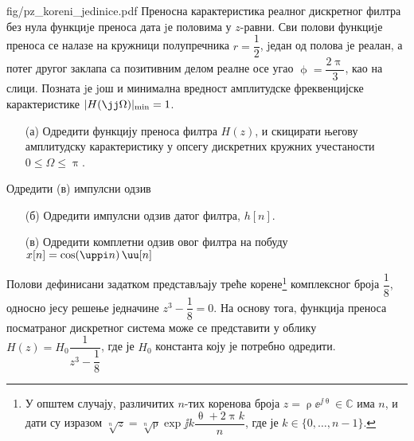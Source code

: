 \begin{slikaDesno}{fig/pz_koreni_jedinice.pdf}
    \PID 
    Преносна карактеристика реалног дискретног филтра без нула функциjе преноса
    дата jе половима у $z$-равни. Сви полови функциjе преноса се налазе на кружници
    полупречника $r = \dfrac12$, jедан од полова jе реалан, а потег другог заклапа са позитивним
    делом реалне осе угао $\upphi = \dfrac{2\uppi}{3}$, као на слици. Позната jе jош и минимална вредност
    амплитудске фреквенцијске карактеристике $|H(\jj\Omega)|_{\rm min} = 1$. 
    \begin{enumerate}
        \item[(а)]  Одредити функцију
                    преноса филтра $H(z)$, и скицирати његову амплитудску карактеристику у 
                    опсегу дискретних кружних учестаности $0 \leq \Omega \leq \uppi$.
    \end{enumerate}
    Одредити (в) импулсни одзив
\end{slikaDesno}
\begin{enumerate}
    \item[(б)] Одредити импулсни одзив датог филтра, $h[n]$. 
    \item[(в)] Одредити комплетни одзив овог филтра на побуду $x[n] = \cos(\uppi n)\, \uu[n]$
\end{enumerate}

\RESENJE
Полови дефинисани задатком представљају треће корене\footnote{У општем случају, различитих $n$-тих коренова  
броја $z = \uprho \ee^{\jj\uptheta} \in \mathbb C$ има $n$, и дати су изразом 
$\sqrt[n]{z} = \sqrt[n]{\uprho} \exp{\jj k \dfrac{\uptheta + 2\uppi k}{n}}$, где је $k \in \{0,\ldots,n-1\}$.} 
комплексног броја $\dfrac{1}{8}$, односно јесу решење једначине 
$z^3 - \dfrac{1}{8} = 0$. На основу тога, функција преноса посматраног дискретног система може се представити у облику 
$H(z) = H_0 \dfrac{1}{z^3 - \dfrac{1}{8}}$, где је $H_0$ константа коју је потребно одредити.  

